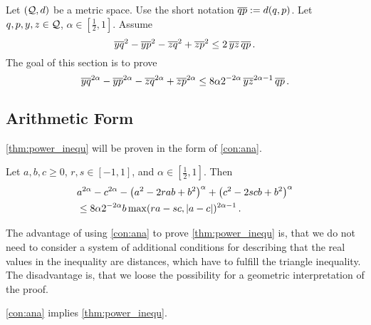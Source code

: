 %
Let $(\mathcal{Q}, d)$ be a metric space. Use the short notation $\overline{qp} := d(q,p)$.
Let $q,p,y,z\in\mathcal{Q}$, $\alpha\in[\frac12,1]$. 
Assume
\begin{equation*}
	\overline{yq}^{2} - \overline{yp}^{2} - \overline{zq}^{2} + \overline{zp}^{2} \leq 2 \, \overline{yz}\, \overline{qp}
	\, .
\end{equation*}
The goal of this section is to prove 
\begin{equation*}
	\overline{yq}^{2\alpha} - \overline{yp}^{2\alpha} - \overline{zq}^{2\alpha} + \overline{zp}^{2\alpha} \leq 8 \alpha 2^{-2\alpha} \, \overline{yz}^{2\alpha-1}\, \overline{qp}
	\, .
\end{equation*}
%
%
%
\subsection{Arithmetic Form}
%
\autoref{thm:power_inequ} will be proven in the form of \autoref{con:ana}. 
%
\begin{lemma}\label{con:ana}
	Let $a,b,c\geq0$, $r,s\in[-1,1]$, and $\alpha\in[\frac12, 1]$.
	Then
	\begin{align*}
		&a^{2\alpha}-c^{2\alpha}-\left( a^2-2rab+b^2 \right)^\alpha+\left( c^2-2scb+b^2 \right)^\alpha 
		\\&\leq 
		8 \alpha 2^{-2\alpha} b \max(ra - sc, |a-c|)^{2\alpha-1}
		\, .
	\end{align*}
\end{lemma}
%
The advantage of using \autoref{con:ana} to prove \autoref{thm:power_inequ} is, that we do not need to consider a system of additional conditions for describing that the real values in the inequality are distances, which have to fulfill the triangle inequality. The disadvantage is, that we loose the possibility for a geometric interpretation of the proof.
%
\begin{lemma}\label{lmm:power_implies}
	\autoref{con:ana} implies \autoref{thm:power_inequ}.
\end{lemma}
%
